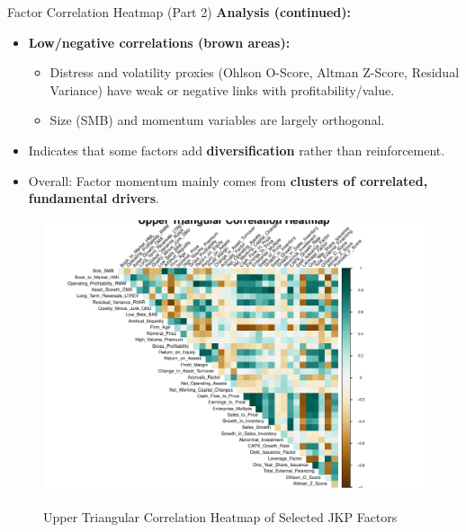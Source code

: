 \documentclass[t]{beamer}
\makeatletter
\def\maxwidth{%
  \ifdim\Gin@nat@width>\linewidth
    \linewidth
  \else
    \Gin@nat@width
  \fi
}
\newenvironment{knitrout}{}{}
\makeatother
\begin{document}
\begin{frame}{Factor Correlation Heatmap (Part 2)}
\textbf{Analysis (continued):}
\begin{itemize}
    \item \textbf{Low/negative correlations (brown areas):}
    \begin{itemize}
        \item Distress and volatility proxies (Ohlson O-Score, Altman Z-Score, Residual Variance) have weak or negative links with profitability/value.
        \item Size (SMB) and momentum variables are largely orthogonal.
    \end{itemize}
    \item Indicates that some factors add \textbf{diversification} rather than reinforcement.
    \item Overall: Factor momentum mainly comes from \textbf{clusters of correlated, fundamental drivers}.
\end{itemize}
\end{frame}

\begin{frame}
\begin{knitrout}
\color{fgcolor}
\begin{figure}
{\centering \includegraphics[width=\maxwidth]{figure/corr_heatmap1-1} }
\caption[Upper Triangular Correlation Heatmap of Selected JKP Factors]{Upper Triangular Correlation Heatmap of Selected JKP Factors}
\label{fig:corr_heatmap1}
\end{figure}
\end{knitrout}
\end{frame}
\end{document}
